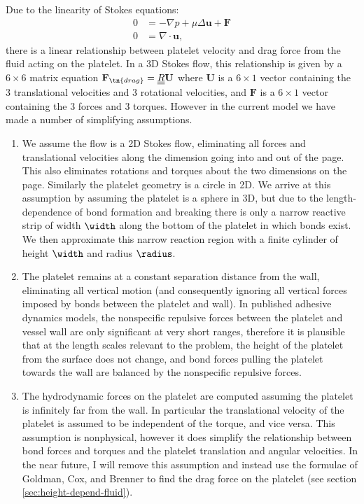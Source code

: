 Due to the linearity of Stokes equations:
\begin{align}
  \label{eq:stokes-momentum}
  0 &= -\nabla p + \mu\Delta \mathbf{u} + \mathbf{F}\\
  \label{eq:stokes-mass}
  0 &= \nabla \cdot \mathbf{u},
\end{align}
there is a linear relationship between platelet velocity and drag
force from the fluid acting on the platelet. In a 3D Stokes flow, this
relationship is given by a $6 \times 6$ matrix equation
$\mathbf{F}_\tn{drag} = \underline{\underline{R}} \mathbf{U}$ where
$\mathbf{U}$ is a $6 \times 1$ vector containing the 3 translational
velocities and 3 rotational velocities, and $\mathbf{F}$ is a
$6 \times 1$ vector containing the 3 forces and 3 torques. However in
the current model we have made a number of simplifying assumptions.
\begin{enumerate}
\item We assume the flow is a 2D Stokes flow, eliminating all forces
  and translational velocities along the dimension going into and out
  of the page. This also eliminates rotations and torques about the
  two dimensions on the page. Similarly the platelet geometry is a
  circle in 2D. We arrive at this assumption by assuming the platelet
  is a sphere in 3D, but due to the length-dependence of bond
  formation and breaking there is only a narrow reactive strip of
  width $\width$ along the bottom of the platelet in which bonds
  exist. We then approximate this narrow reaction region with a finite
  cylinder of height $\width$ and radius $\radius$.
\item The platelet remains at a constant separation distance from the
  wall, eliminating all vertical motion (and consequently ignoring all
  vertical forces imposed by bonds between the platelet and wall). In
  published adhesive dynamics models, the nonspecific repulsive forces
  between the platelet and vessel wall are only significant at very
  short ranges, therefore it is plausible that at the length scales
  relevant to the problem, the height of the platelet from the surface
  does not change, and bond forces pulling the platelet towards the
  wall are balanced by the nonspecific repulsive forces.
\item The hydrodynamic forces on the platelet are computed assuming
  the platelet is infinitely far from the wall. In particular the
  translational velocity of the platelet is assumed to be independent
  of the torque, and vice versa. This assumption is nonphysical,
  however it does simplify the relationship between bond forces and
  torques and the platelet translation and angular velocities. In the
  near future, I will remove this assumption and instead use the
  formulae of Goldman, Cox, and Brenner
  \cite{Goldman1967a,Goldman1967b} to find the drag force on the
  platelet (see section \ref{sec:height-depend-fluid}).
\end{enumerate}
